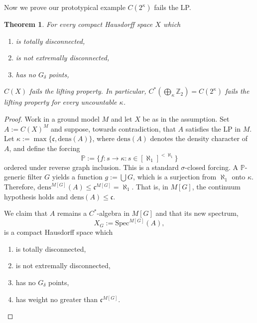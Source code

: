 \documentclass[10pt]{amsart}
\newtheorem{thm}{Theorem}[section]
\theoremstyle{definition}
\begin{document}
Now we prove our prototypical example $C(2^\kappa)$ fails the LP.

\begin{thm}\label{LP2}
    For every compact Hausdorff space $X$ which
    \begin{enumerate}
        \item is totally disconnected,
        \item is not extremally disconnected,
        \item has no $G_\delta$ points,
    \end{enumerate}
    $C(X)$ fails the lifting property. In particular, $C^*(\bigoplus_\mathfrak{\kappa}\mathbb{Z}_2)=C(2^\kappa)$ fails the lifting property for every uncountable $\kappa$.
\end{thm}

\begin{proof}
    Work in a ground model $M$ and let $X$ be as in the assumption. Set $A:=C(X)^M$ and suppose, towards contradiction, that $A$ satisfies the LP in $M$. Let $\kappa:=\max\{\mathfrak{c},\mathrm{dens}(A)\}$, where $\mathrm{dens}(A)$ denotes the density character of $A$, and define the forcing
    \[\mathbb{P}:=\{f: s\rightarrow\kappa: s\in[\aleph_1]^{<\aleph_1}\}\]
    ordered under reverse graph inclusion. This is a standard $\sigma$-closed forcing. A $\mathbb{P}$-generic filter $G$ yields a function $g:=\bigcup G$, which is a surjection from $\aleph_1$ onto $\kappa$. Therefore, $\mathrm{dens}^{M[G]}(A)\leq\mathfrak{c}^{M[G]}=\aleph_1$. That is, in $M[G]$, the continuum hypothesis holds and $\mathrm{dens}(A)\leq\mathfrak{c}$. 
    
    We claim that $A$ remains a $C^*$-algebra in $M[G]$ and that its new spectrum,
    \[X_G:=\mathrm{Spec}^{M[G]}(A),\]
    is a compact Hausdorff space which
    \begin{enumerate}
        \item is totally disconnected,
        \item is not extremally disconnected,
        \item has no $G_\delta$ points,
        \item has weight no greater than $\mathfrak{c}^{M[G]}$.
    \end{enumerate}


\end{proof}
\end{document}

